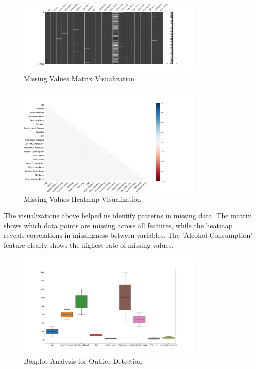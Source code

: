 \documentclass[11pt,a4paper]{article}
\begin{document}
\begin{figure}[H]
    \centering
    \includegraphics[width=0.8\textwidth]{./pictures/missing_values_matrix.png}
    \caption{Missing Values Matrix Visualization}
\end{figure}

\begin{figure}[H]
    \centering
    \includegraphics[width=0.8\textwidth]{./pictures/missing_values_heatmap.png}
    \caption{Missing Values Heatmap Visualization}
\end{figure}

The visualizations above helped us identify patterns in missing data. The matrix shows which data points are missing across all features, while the heatmap reveals correlations in missingness between variables. The 'Alcohol Consumption' feature clearly shows the highest rate of missing values.

\begin{figure}[H]
    \centering
    \includegraphics[width=0.8\textwidth]{./pictures/outliers.png}
    \caption{Boxplot Analysis for Outlier Detection}
\end{figure}
\end{document}
